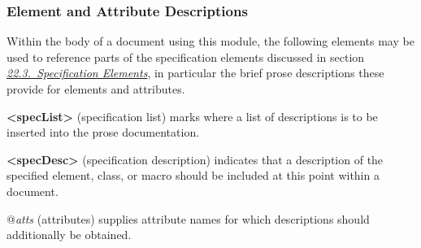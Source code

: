 \subsubsection[{Element and Attribute Descriptions}]{Element and Attribute Descriptions}\label{TDphraseEA}\par
Within the body of a document using this module, the following elements may be used to reference parts of the specification elements discussed in section \textit{\hyperref[TDcrystals]{22.3.\ Specification Elements}}, in particular the brief prose descriptions these provide for elements and attributes. 
\begin{sansreflist}
  
\item [\textbf{<specList>}] (specification list) marks where a list of descriptions is to be inserted into the prose documentation.
\item [\textbf{<specDesc>}] (specification description) indicates that a description of the specified element, class, or macro should be included at this point within a document.\hfil\\[-10pt]\begin{sansreflist}
    \item[@{\itshape atts}]
  (attributes) supplies attribute names for which descriptions should additionally be obtained.
\end{sansreflist}  
\end{sansreflist}
\par
